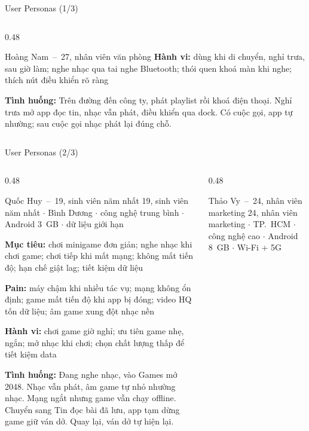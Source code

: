 \begin{frame}{User Personas (1/3)}
\begin{columns}[T]
\begin{column}{0.48\textwidth}
\begin{block}{\small Hoàng Nam~--~27, nhân viên văn phòng}
{\tiny\textbf{Hành vi:} dùng khi di chuyển, nghỉ trưa, sau giờ làm; nghe nhạc qua tai nghe Bluetooth; thói quen khoá màn khi nghe; thích nút điều khiển rõ ràng}\par\vspace{0.4mm}
{\tiny\textbf{Tình huống:} Trên đường đến công ty, phát playlist rồi khoá điện thoại. Nghỉ trưa mở app đọc tin, nhạc vẫn phát, điều khiển qua dock. Có cuộc gọi, app tự nhường; sau cuộc gọi nhạc phát lại đúng chỗ.}
\end{block}
\end{column}
\end{columns}
\end{frame}

\begin{frame}{User Personas (2/3)}
\linespread{0.88}%
\begin{columns}[T]
\begin{column}{0.48\textwidth}
\begin{block}{\small Quốc Huy~--~19, sinh viên năm nhất}
{\tiny\color{TextGray} 19, sinh viên năm nhất $\cdot$ Bình Dương $\cdot$ công nghệ trung bình $\cdot$ Android 3~GB $\cdot$ dữ liệu giới hạn}\par\vspace{0.6mm}
{\tiny\textbf{Mục tiêu:} chơi minigame đơn giản; nghe nhạc khi chơi game; chơi tiếp khi mất mạng; không mất tiến độ; hạn chế giật lag; tiết kiệm dữ liệu}\par\vspace{0.4mm}
{\tiny\textbf{Pain:} máy chậm khi nhiều tác vụ; mạng không ổn định; game mất tiến độ khi app bị đóng; video HQ tốn dữ liệu; âm game xung đột nhạc nền}\par\vspace{0.4mm}
{\tiny\textbf{Hành vi:} chơi game giờ nghỉ; ưu tiên game nhẹ, ngắn; mở nhạc khi chơi; chọn chất lượng thấp để tiết kiệm data}\par\vspace{0.4mm}
{\tiny\textbf{Tình huống:} Đang nghe nhạc, vào Games mở 2048. Nhạc vẫn phát, âm game tự nhỏ nhường nhạc. Mạng ngắt nhưng game vẫn chạy offline. Chuyển sang Tin đọc bài đã lưu, app tạm dừng game giữ ván dở. Quay lại, ván dở tự hiện lại.}
\end{block}
\end{column}
\begin{column}{0.48\textwidth}
\begin{block}{\small Thảo Vy~--~24, nhân viên marketing}
{\tiny\color{TextGray} 24, nhân viên marketing $\cdot$ TP.\ HCM $\cdot$ công nghệ cao $\cdot$ Android 8~GB $\cdot$ Wi-Fi + 5G}\par\vspace{0.6mm}

\end{block}
\end{column}
\end{columns}
\end{frame}
